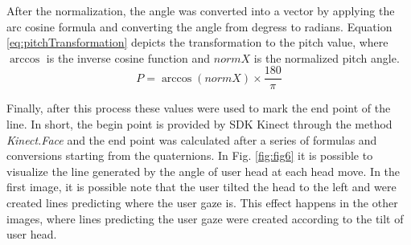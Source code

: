 \documentclass[10pt, conference]{IEEEtran}
\begin{document}
	After the normalization, the angle was converted into a vector by applying the arc cosine formula and converting the angle from degress to radians.
	Equation \ref{eq:pitchTransformation} depicts the transformation to the pitch value, where $\arccos$ is the inverse cosine function and $normX$ is the normalized pitch angle.
	\begin{equation}
    	P = \arccos{(normX)} \times \frac{180}{\pi}
		\label{eq:pitchTransformation}
	\end{equation}
	
	Finally, after this process these values were used to mark the end point of the line. 
	In short, the begin point is provided by SDK Kinect through the method \emph{Kinect.Face} and the end point was calculated after a series of formulas and conversions starting from the quaternions. 
	In Fig. \ref{fig:fig6} it is possible to visualize the line generated by the angle of user head at each head move. 
	In the first image, it is possible note that the user tilted the head to the left and were created lines predicting where the user gaze is. 
	This effect happens in the other images, where lines predicting the user gaze were created according to the tilt of user head.
\end{document}
